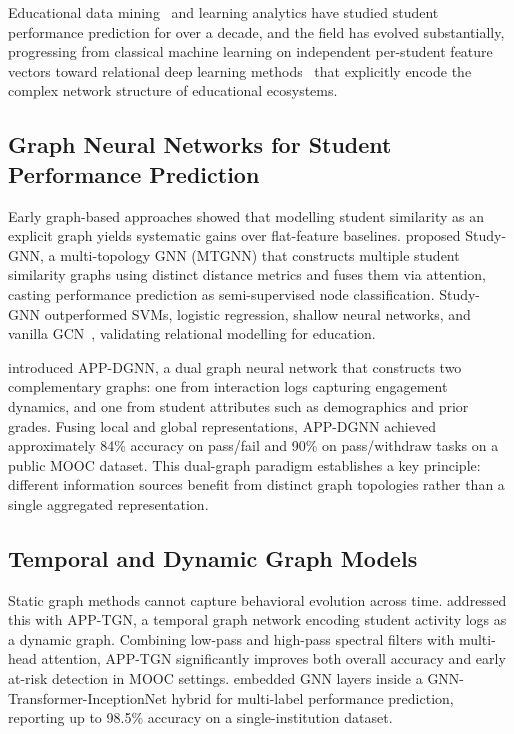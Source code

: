 \documentclass[sigconf,review]{acmart}
\begin{document}
Educational data mining~\citep{baker2010data} and learning
analytics have studied student performance prediction for over
a decade, and the field has evolved substantially, progressing
from classical machine learning on independent per-student
feature vectors toward relational deep learning
methods~\citep{zhou2020graph} that explicitly encode the
complex network structure of educational ecosystems.

\subsection{Graph Neural Networks for Student Performance Prediction}

Early graph-based approaches showed that modelling student similarity as
an explicit graph yields systematic gains over flat-feature baselines.
\citet{li2022studygnn} proposed Study-GNN, a multi-topology GNN (MTGNN)
that constructs multiple student similarity graphs using distinct distance
metrics and fuses them via attention, casting performance prediction as
semi-supervised node classification. Study-GNN outperformed SVMs, logistic
regression, shallow neural networks, and vanilla
GCN~\citep{kipf2017semi}, validating relational
modelling for education.

\citet{huang2024dual} introduced APP-DGNN, a dual graph neural network
that constructs two complementary graphs: one from interaction logs
capturing engagement dynamics, and one from student attributes such as
demographics and prior grades. Fusing local and global representations,
APP-DGNN achieved approximately 84\% accuracy on pass/fail and 90\% on
pass/withdraw tasks on a public MOOC dataset. This dual-graph paradigm
establishes a key principle: different information sources benefit from
distinct graph topologies rather than a single aggregated representation.

\subsection{Temporal and Dynamic Graph Models}

Static graph methods cannot capture behavioral evolution across time.
\citet{huang2024temporal} addressed this with APP-TGN, a temporal graph
network encoding student activity logs as a dynamic graph. Combining
low-pass and high-pass spectral filters with multi-head attention, APP-TGN
significantly improves both overall accuracy and early at-risk detection in
MOOC settings. \citet{zhang2025gnttinet} embedded GNN layers inside a
GNN-Transformer-InceptionNet hybrid for multi-label performance prediction,
reporting up to 98.5\% accuracy on a single-institution dataset.
\end{document}
